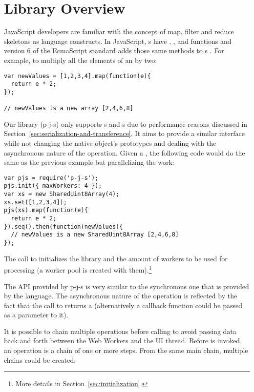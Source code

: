 \section{Library Overview}\label{sec:overview}
JavaScript developers are familiar with the concept of map, filter and reduce skeletons as language constructs. In JavaScript, s have , , and  functions and version 6 of the EcmaScript standard adds those same methods to \ttarray{}s \cite{es6}. For example, to multiply all the elements of an  by two:
\begin{lstlisting}[caption=Example creating a new array with the values of the original one multiplied by two]
var newValues = [1,2,3,4].map(function(e){
  return e * 2;
});

// newValues is a new array [2,4,6,8]
\end{lstlisting}

Our library (p-j-s) only supports \tstarray{}s and \ttarray{}s due to performance reasons discussed in Section~\ref{sec:serialization-and-transference}. It aims to provide a similar interface while not changing the native object's prototypes and dealing with the asynchronous nature of the operation. Given a \tstarray{}, the following code would do the same as the previous example but parallelizing the work:
\begin{lstlisting}[caption=Example creating a new array with the values of the original one multiplied by two using p-j-s]
var pjs = require('p-j-s');
pjs.init({ maxWorkers: 4 });
var xs = new SharedUint8Array(4);
xs.set([1,2,3,4]);
pjs(xs).map(function(e){
  return e * 2;
}).seq().then(function(newValues){
  // newValues is a new SharedUint8Array [2,4,6,8]
});
\end{lstlisting}

The call to  initializes the library and the amount of workers to be used for processing (a worker pool is created with them).\footnote{More details in Section~\ref{sec:initialization}.}

The API provided by p-j-s \cite{pjs-api} is very similar to the synchronous one that is provided by the language. The asynchronous nature of the operation is reflected by the fact that the call to  returns a  \cite{promise} (alternatively a callback function could be passed as a parameter to it).

It is possible to chain multiple operations before calling  to avoid passing data back and forth between the Web Workers and the UI thread. Before  is invoked, an operation is a chain of one or more steps. From the same main chain, multiple chains could be created:

